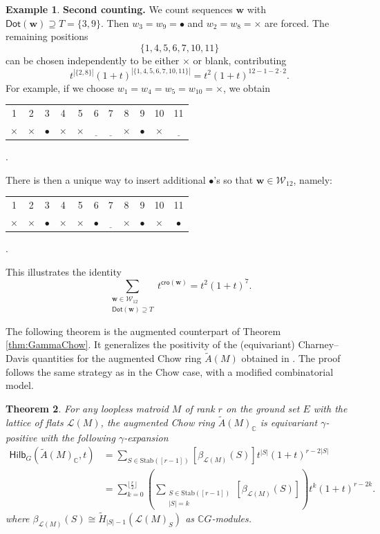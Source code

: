 \documentclass[reqno]{amsart}
\newcommand{\Stab}{{\mathrm{Stab}}}
\newcommand{\cro}{{\mathsf{cro}}}
\renewcommand{\Dot}{{\mathsf{Dot}}}
\renewcommand{\L}{{\mathcal{L}}}
\newcommand{\Hilb}{{\mathsf{Hilb}}}
\newcommand{\floor}[1]{\lfloor #1 \rfloor}
\newtheorem{thm}{Theorem}[section]
\theoremstyle{definition}
\newtheorem{exa}[thm]{Example}
\theoremstyle{remark}
\begin{document}
\begin{exa}
\medskip
\noindent
\textbf{Second counting.}
We count sequences $\mathbf{w}$ with $\Dot(\mathbf{w})\supseteq T=\{3,9\}$. Then $w_3=w_9=\bullet$ and $w_2=w_8=\times$ are forced. The remaining positions
\[
\{1,4,5,6,7,10,11\}
\]
can be chosen independently to be either $\times$ or blank, contributing
\[
t^{|\{2,8\}|}(1+t)^{|\{1,4,5,6,7,10,11\}|}
= t^2(1+t)^{12-1-2\cdot 2}.
\]
For example, if we choose $w_1=w_4=w_5=w_{10}=\times$, we obtain
\begin{center}
\begin{tabular}{c c c c c c c c c c c}
1 & 2 & 3 & 4 & 5 & 6 & 7 & 8 & 9 & 10 & 11\\
$\times$ & $\times$ & $\bullet$ & $\times$ & $\times$ & $\underline{\phantom{~}}$ & $\underline{\phantom{~}}$ & $\times$ & $\bullet$ & $\times$ & $\underline{\phantom{~}}$
\end{tabular}.
\end{center}
There is then a unique way to insert additional $\bullet$'s so that $\mathbf{w}\in\mathcal{W}_{12}$, namely:
\begin{center}
\begin{tabular}{c c c c c c c c c c c}
1 & 2 & 3 & 4 & 5 & 6 & 7 & 8 & 9 & 10 & 11\\
$\times$ & $\times$ & $\bullet$ & $\times$ & $\times$ & $\bullet$ & $\underline{\phantom{~}}$ & $\times$ & $\bullet$ & $\times$ & $\bullet$
\end{tabular}.
\end{center}
This illustrates the identity
\[
\sum_{\substack{\mathbf{w}\in\mathcal{W}_{12}\\ \Dot(\mathbf{w})\supseteq T}}
t^{\cro(\mathbf{w})}
= t^2(1+t)^7.
\]
\end{exa}
 
The following theorem is the augmented counterpart of Theorem \ref{thm:GammaChow}. 
It generalizes the positivity of the (equivariant) Charney--Davis quantities for the augmented Chow ring $\widetilde{A}(M)$ obtained in \cite[Lemma~4.12]{Liao2023Two}.
The proof follows the same strategy as in the Chow case, with a modified combinatorial model.


\begin{thm} \label{thm:GammaAug}
For any loopless matroid $M$ of rank $r$ on the ground set $E$ with the lattice of flats $\L(M)$, the augmented Chow ring $\widetilde{A}(M)_{\mathbb{C}}$ is equivariant $\gamma$-positive with the following $\gamma$-expansion
\begin{align*}
    \Hilb_{G}(\widetilde{A}(M)_{\mathbb{C}},t) 
    &=\sum_{S\in\Stab([r-1])}[\beta_{\L(M)}(S)] t^{|S|}(1+t)^{r-2|S|}\\
    &=\sum_{k=0}^{\floor{\frac{r}{2}}}\left(\sum_{\substack{S\in\Stab([r-1])\\ |S|=k}}[\beta_{\L(M)}(S)]\right)t^k(1+t)^{r-2k}.
\end{align*}
where $\beta_{\L(M)}(S)\cong \tilde{H}_{|S|-1}(\L(M)_S)$ as $\mathbb{C}G$-modules.
\end{thm}
\end{document}
